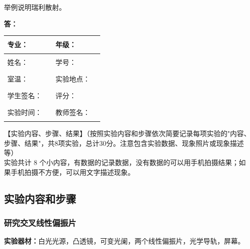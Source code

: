 \documentclass[dvipsnames, svgnames,a4paper,11pt]{article}
\newcommand{\answerblank}[1][3.8cm]{%
  \par\nopagebreak[4]\noindent\textbf{答：}\par\nopagebreak[4]\vspace*{#1}}
\begin{document}
\noindent

\begin{question}
    举例说明瑞利散射。
\end{question}
\answerblank[3.8cm]

\clearpage
\begin{table}
	\renewcommand\arraystretch{1.7}
	\centering
	\begin{tabularx}{\textwidth}{|X|X|X|X|}
	\hline
	专业：& \rule{2.5cm}{0.4pt} &年级：& \rule{2.5cm}{0.4pt} \\
	\hline
	姓名： & \rule{2.5cm}{0.4pt} & 学号：&\rule{3cm}{0.4pt}\\
	\hline
	室温：& \rule{2.5cm}{0.4pt} & 实验地点： & \rule{2.5cm}{0.4pt} \\
	\hline
学生签名：&\rule{2.5cm}{0.4pt} & 评分： &\\
	\hline
	实验时间：& \rule{3cm}{0.4pt} & 教师签名：& \rule{3cm}{0.4pt} \\
	\hline
	\end{tabularx}
\end{table}

【实验内容、步骤、结果】（按照实验内容和步骤依次简要记录每项实验的"内容、步骤、结果"，共8项实验，总计30分。注意包含实验数据、现象照片或现象描述等）\\
实验共计 8 个小内容，有数据的记录数据，没有数据的可以用手机拍摄结果；如果手机拍摄不方便，可以用文字描述现象。
\subsection{实验内容和步骤}
\subsubsection{研究交叉线性偏振片}
\textbf{实验器材：}白光光源，凸透镜，可变光阑，两个线性偏振片，光学导轨，屏幕。
\end{document}
